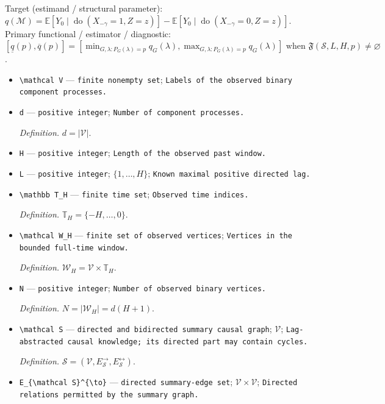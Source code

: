 \documentclass{article}
\begin{document}
Target (estimand / structural parameter): \(q(\mathcal M)=\mathbb E[Y_0\mid\operatorname{do}(X_{-\gamma}=1,Z=z)]-\mathbb E[Y_0\mid\operatorname{do}(X_{-\gamma}=0,Z=z)]\).
Primary functional / estimator / diagnostic: \([\underline q(p),\overline q(p)]=[\min_{G,\lambda:P_G(\lambda)=p}q_G(\lambda),\max_{G,\lambda:P_G(\lambda)=p}q_G(\lambda)]\text{ when }\mathfrak F(\mathcal S,L,H,p)\ne\varnothing\).
\begin{itemize}
  \item \texttt{\textbackslash{}\allowbreak{}mathcal V} --- \texttt{finite nonempty set}; \texttt{Labels of the observed binary component processes.}
  \item \texttt{d} --- \texttt{positive integer}; \texttt{Number of component processes.}
  \par\smallskip\noindent\emph{Definition.} \(d=|\mathcal V|\).
  \item \texttt{H} --- \texttt{positive integer}; \texttt{Length of the observed past window.}
  \item \texttt{L} --- \texttt{positive integer}; \(\{1,\ldots,H\}\); \texttt{Known maximal positive directed lag.}
  \item \texttt{\textbackslash{}\allowbreak{}mathbb T\_\allowbreak{}H} --- \texttt{finite time set}; \texttt{Observed time indices.}
  \par\smallskip\noindent\emph{Definition.} \(\mathbb T_H=\{-H,\ldots,0\}\).
  \item \texttt{\textbackslash{}\allowbreak{}mathcal W\_\allowbreak{}H} --- \texttt{finite set of observed vertices}; \texttt{Vertices in the bounded full-\allowbreak{}time window.}
  \par\smallskip\noindent\emph{Definition.} \(\mathcal W_H=\mathcal V\times\mathbb T_H\).
  \item \texttt{N} --- \texttt{positive integer}; \texttt{Number of observed binary vertices.}
  \par\smallskip\noindent\emph{Definition.} \(N=|\mathcal W_H|=d(H+1)\).
  \item \texttt{\textbackslash{}\allowbreak{}mathcal S} --- \texttt{directed and bidirected summary causal graph}; \(\mathcal V\); \texttt{Lag-\allowbreak{}abstracted causal knowledge;\allowbreak{} its directed part may contain cycles.}
  \par\smallskip\noindent\emph{Definition.} \(\mathcal S=(\mathcal V,E_{\mathcal S}^{\to},E_{\mathcal S}^{\leftrightarrow})\).
  \item \texttt{E\_\allowbreak{}\{\textbackslash{}\allowbreak{}mathcal S\}\allowbreak{}\textasciicircum{}\{\textbackslash{}\allowbreak{}to\}\allowbreak{}} --- \texttt{directed summary-\allowbreak{}edge set}; \(\mathcal V\times\mathcal V\); \texttt{Directed relations permitted by the summary graph.}

\end{itemize}
\end{document}

